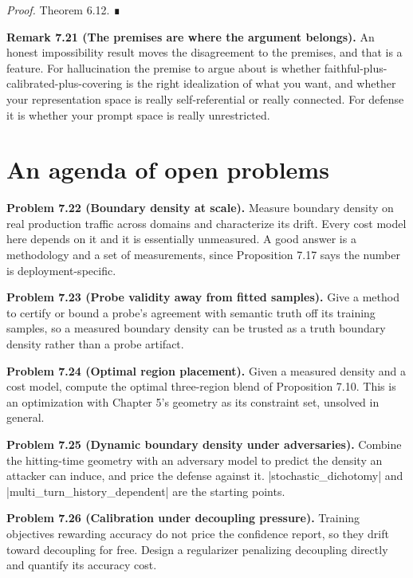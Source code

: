 \documentclass{memoir}
\begin{document}
\emph{Proof.} Theorem 6.12. ∎

\textbf{Remark 7.21 (The premises are where the argument belongs).} An honest impossibility
result moves the disagreement to the premises, and that is a feature. For
hallucination the premise to argue about is whether
faithful-plus-calibrated-plus-covering is the right idealization of what you
want, and whether your representation space is really self-referential or really
connected. For defense it is whether your prompt space is really unrestricted.



\section{An agenda of open problems}\label{Two--Schemas--of--Impossibility-005F-005F-005F--Machine--Checked--Limits--of--Trustworthy--Machine--Learning-005F-005F-005F--and--Why--They--Tighten--with--Capability----What--It--Means--for--AI--Safety----An--agenda--of--open--problems}

\textbf{Problem 7.22 (Boundary density at scale).} Measure boundary density on real
production traffic across domains and characterize its drift. Every cost model
here depends on it and it is essentially unmeasured. A good answer is a
methodology and a set of measurements, since Proposition 7.17 says the number is
deployment-specific.

\textbf{Problem 7.23 (Probe validity away from fitted samples).} Give a method to certify or
bound a probe's agreement with semantic truth off its training samples, so a
measured boundary density can be trusted as a truth boundary density rather than
a probe artifact.

\textbf{Problem 7.24 (Optimal region placement).} Given a measured density and a cost model,
compute the optimal three-region blend of Proposition 7.10. This is an
optimization with Chapter 5's geometry as its constraint set, unsolved in
general.

\textbf{Problem 7.25 (Dynamic boundary density under adversaries).} Combine the hitting-time
geometry with an adversary model to predict the density an attacker can induce,
and price the defense against it. \LeanVerb|stochastic_dichotomy| and
\LeanVerb|multi_turn_history_dependent| are the starting points.

\textbf{Problem 7.26 (Calibration under decoupling pressure).} Training objectives rewarding
accuracy do not price the confidence report, so they drift toward decoupling for
free. Design a regularizer penalizing decoupling directly and quantify its
accuracy cost.
\end{document}
